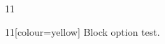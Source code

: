 \documentclass[paper=A4]{ropas-poster}
\begin{document}
\begin{postergrid}{1}{1}
\begin{posterblock}{1}{1}[colour=yellow]
Block option test.
\end{posterblock}
\end{postergrid}
\end{document}
